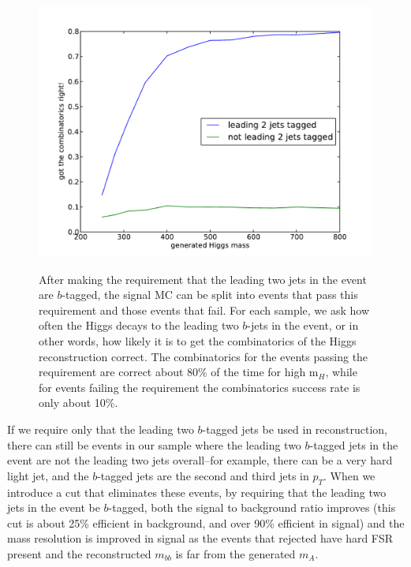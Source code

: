\begin{figure}
  \centering
    \includegraphics[width=0.78\linewidth]{SignalKin/combinatorics_success.pdf}
    \label{fig:combinatorics_success}
    \caption{After making the requirement that the leading two jets in the event are $b$-tagged,
    the signal MC can be split into events that pass this requirement and those events that fail.
    For each sample, we ask how often the Higgs decays to the leading two $b$-jets in the event,
    or in other words, how likely it is to get the combinatorics of the Higgs reconstruction correct.
    The combinatorics for the events passing the requirement are correct about 80\% of the time for
    high m$_H$, while for events failing the requirement the combinatorics success rate is only about 10\%.}
\end{figure}
                                                                                                                                                                 
                                                                                                                                    
If we require only that the leading two $b$-tagged jets be used in reconstruction, there can                                          
still be events in our sample where the leading two $b$-tagged jets in the event are not                                              
the leading two jets overall--for example, there can be a very hard light jet, and the $b$-tagged                                     
jets are the second and third jets in $p_T$.  When we introduce a cut that eliminates these events,                                 
by requiring that the leading two jets in the event be $b$-tagged, both the signal to background                                      
ratio improves (this cut is about 25\% efficient in background, and over 90\% efficient                                             
in signal) and the mass resolution is improved in signal as the events that rejected have                                           
hard FSR present and the reconstructed $m_{bb}$ is far from the generated $m_A$.    

